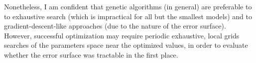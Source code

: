 Nonetheless, I am confident that genetic algorithms (in general) are preferable to to exhaustive search (which is impractical for all but the smallest models) and to gradient-descent-like approaches (due to the nature of the error surface).
However, successful optimization may require periodic exhaustive, local grids searches of the parameters space near the optimized values, in order to evaluate whether the error surface was tractable in the first place.
